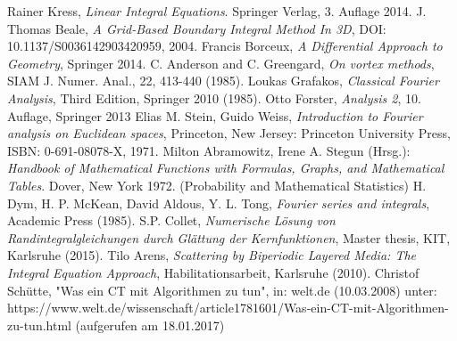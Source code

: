 \documentclass[12pt,a4paper]{scrartcl}
\numberwithin{equation}{section}
\begin{document}
  \newpage

\begin{thebibliography}{Lam00}
   Rainer Kress, \emph{Linear Integral Equations}. Springer Verlag, 3. Auflage 2014.
   J. Thomas Beale, \emph{A Grid-Based Boundary Integral Method In 3D}, DOI: 10.1137/S0036142903420959, 2004.
   Francis Borceux, \emph{A Differential Approach to Geometry}, Springer 2014.
   C. Anderson and C. Greengard, \emph{On vortex methods}, SIAM J. Numer. Anal., 22, 413-440
(1985).
   Loukas Grafakos, \emph{Classical Fourier Analysis}, Third Edition, Springer 2010
(1985).
   Otto Forster, \emph{Analysis 2}, 10. Auflage, Springer 2013
   Elias M. Stein, Guido Weiss, \emph{Introduction to Fourier analysis on Euclidean
spaces}, Princeton, New Jersey: Princeton University Press, ISBN: 0-691-08078-X,
1971.
   Milton Abramowitz, Irene A. Stegun (Hrsg.): \emph{Handbook of Mathematical Functions with Formulas, Graphs, and Mathematical Tables}. Dover, New York 1972.
  (Probability and Mathematical Statistics) H. Dym, H. P. McKean, David Aldous, Y. L. Tong, \emph{Fourier series and integrals}, Academic Press (1985).
   S.P. Collet, \emph{Numerische Lösung von Randintegralgleichungen durch Glättung der Kernfunktionen}, Master thesis, KIT, Karlsruhe (2015).
    Tilo Arens, \emph{Scattering by Biperiodic Layered Media: The Integral Equation Approach}, Habilitationsarbeit, Karlsruhe (2010).
   Christof Schütte, "Was ein CT mit Algorithmen zu tun", in: welt.de (10.03.2008) unter: https://www.welt.de/wissenschaft/article1781601/Was-ein-CT-mit-Algorithmen-zu-tun.html (aufgerufen am 18.01.2017)
 \end{thebibliography}

      

%  
%
%
%
%
%
%
%
%
\end{document}
